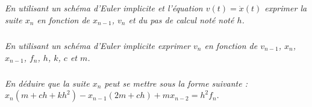 \documentclass[10pt]{article}
\newif\ifprof
\begin{document}
%

\subparagraph{}
\textit{En utilisant un schéma d'Euler implicite et l'équation $v(t) = \dot{x}(t)$ 
exprimer la suite $x_{n}$ en fonction de $x_{n-1}$, $v_n$ et du pas de calcul noté noté $h$.}

\ifprof
\begin{corrige}
On a $\dfrac{dx(t)}{dt} \simeq \dfrac{x_{n}-x_ {n-1}}{h}$. On a donc 
$v_n = \dfrac{x_{n}-x_{n-1}}{h} \Longleftrightarrow x_{n} = h\cdot v_n + x_{n-1}$.

\end{corrige}
\else
\fi


\subparagraph{}
\textit{En utilisant un schéma d'Euler implicite exprimer $v_n$ en fonction de $v_{n-1}$, $x_{n}$, $x_{n-1}$, $f_n$, $h$, $k$, $c$ et $m$.}

\ifprof
\begin{corrige}

On a $\dfrac{dv(t)}{dt} \simeq \dfrac{v_{n}-v_ {n-1}}{h}$. On a donc 
$\dot{v}_n = \dfrac{v_{n}-v_{n-1}}{h} \Longleftrightarrow v_{n} = h\cdot \dot{v}_n + v_{n-1}$.


$$
m\cdot \dfrac{v_{n}-v_{n-1}}{h} +c\cdot \dfrac{x_{n}-x_{n-1}}{h} + k\cdot x_n = f_n
\Longleftrightarrow
m\cdot (v_{n}-v_{n-1}) +c\cdot (x_{n}-x_{n-1}) + kh\cdot x_n = hf_n
$$


On a donc :
$$
mv_{n}  = hf_n -  (kh+c) \cdot x_n + mv_{n-1}+cx_{n-1}
$$

\end{corrige}
\else
\fi

\subparagraph{}
\textit{En déduire que la suite $x_n$ peut se mettre sous la forme suivante :}
$x_{n}\left(m +ch+ kh^2\right)-x_{n-1}(2m+ch) +mx_{n-2}= h^2f_n$.
\end{document}
